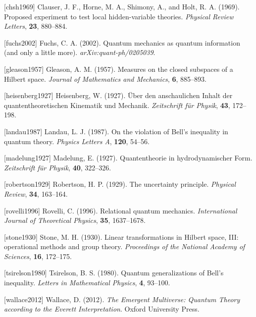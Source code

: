 \documentclass[
  11pt,
]{article}
\begin{document}
{[}chsh1969{]} Clauser, J. F., Horne, M. A., Shimony, A., and Holt, R.
A. (1969). Proposed experiment to test local hidden-variable theories.
\emph{Physical Review Letters}, \textbf{23}, 880--884.

{[}fuchs2002{]} Fuchs, C. A. (2002). Quantum mechanics as quantum
information (and only a little more). \emph{arXiv:quant-ph/0205039}.

{[}gleason1957{]} Gleason, A. M. (1957). Measures on the closed
subspaces of a Hilbert space. \emph{Journal of Mathematics and
Mechanics}, \textbf{6}, 885--893.

{[}heisenberg1927{]} Heisenberg, W. (1927). Über den anschaulichen
Inhalt der quantentheoretischen Kinematik und Mechanik.
\emph{Zeitschrift für Physik}, \textbf{43}, 172--198.

{[}landau1987{]} Landau, L. J. (1987). On the violation of Bell's
inequality in quantum theory. \emph{Physics Letters A}, \textbf{120},
54--56.

{[}madelung1927{]} Madelung, E. (1927). Quantentheorie in
hydrodynamischer Form. \emph{Zeitschrift für Physik}, \textbf{40},
322--326.

{[}robertson1929{]} Robertson, H. P. (1929). The uncertainty principle.
\emph{Physical Review}, \textbf{34}, 163--164.

{[}rovelli1996{]} Rovelli, C. (1996). Relational quantum mechanics.
\emph{International Journal of Theoretical Physics}, \textbf{35},
1637--1678.

{[}stone1930{]} Stone, M. H. (1930). Linear transformations in Hilbert
space, III: operational methods and group theory. \emph{Proceedings of
the National Academy of Sciences}, \textbf{16}, 172--175.

{[}tsirelson1980{]} Tsirelson, B. S. (1980). Quantum generalizations of
Bell's inequality. \emph{Letters in Mathematical Physics}, \textbf{4},
93--100.

{[}wallace2012{]} Wallace, D. (2012). \emph{The Emergent Multiverse:
Quantum Theory according to the Everett Interpretation}. Oxford
University Press.
\end{document}

